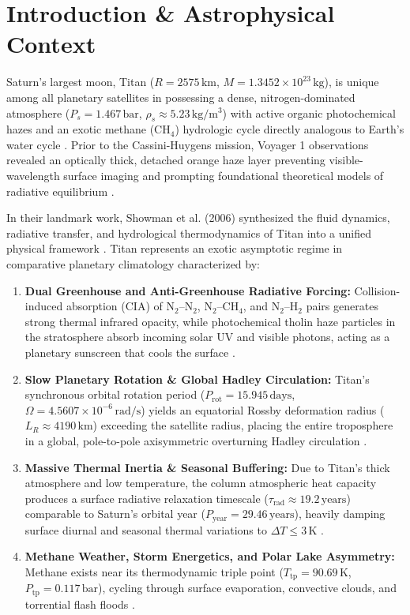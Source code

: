 \documentclass[11pt,a4paper]{article}
\begin{document}
\section{Introduction \& Astrophysical Context}
Saturn's largest moon, Titan ($R = 2575\,\mathrm{km}$, $M = 1.3452 \times 10^{23}\,\mathrm{kg}$), is unique among all planetary satellites in possessing a dense, nitrogen-dominated atmosphere ($P_s = 1.467\,\mathrm{bar}$, $\rho_s \approx 5.23\,\mathrm{kg/m^3}$) with active organic photochemical hazes and an exotic methane ($\mathrm{CH}_4$) hydrologic cycle directly analogous to Earth's water cycle \cite{flasar2005,fulchignoni2005,bird2005}. Prior to the Cassini-Huygens mission, Voyager 1 observations revealed an optically thick, detached orange haze layer preventing visible-wavelength surface imaging and prompting foundational theoretical models of radiative equilibrium \cite{mckay1991,lorenz2001}.

In their landmark work, Showman et al. (2006) synthesized the fluid dynamics, radiative transfer, and hydrological thermodynamics of Titan into a unified physical framework \cite{showman2006,mitchell2006,mitchell2008,tokano2001}. Titan represents an exotic asymptotic regime in comparative planetary climatology characterized by:
\begin{enumerate}
    \item \textbf{Dual Greenhouse and Anti-Greenhouse Radiative Forcing:} Collision-induced absorption (CIA) of $\mathrm{N}_2\text{--}\mathrm{N}_2$, $\mathrm{N}_2\text{--}\mathrm{CH}_4$, and $\mathrm{N}_2\text{--}\mathrm{H}_2$ pairs generates strong thermal infrared opacity, while photochemical tholin haze particles in the stratosphere absorb incoming solar UV and visible photons, acting as a planetary sunscreen that cools the surface \cite{mckay1991,showman2006}.
    \item \textbf{Slow Planetary Rotation \& Global Hadley Circulation:} Titan's synchronous orbital rotation period ($P_{\mathrm{rot}} = 15.945\,\mathrm{days}$, $\Omega = 4.5607 \times 10^{-6}\,\mathrm{rad/s}$) yields an equatorial Rossby deformation radius ($L_R \approx 4190\,\mathrm{km}$) exceeding the satellite radius, placing the entire troposphere in a global, pole-to-pole axisymmetric overturning Hadley circulation \cite{showman2006,mitchell2006}.
    \item \textbf{Massive Thermal Inertia \& Seasonal Buffering:} Due to Titan's thick atmosphere and low temperature, the column atmospheric heat capacity produces a surface radiative relaxation timescale ($\tau_{\mathrm{rad}} \approx 19.2\,\mathrm{years}$) comparable to Saturn's orbital year ($P_{\mathrm{year}} = 29.46\,\mathrm{years}$), heavily damping surface diurnal and seasonal thermal variations to $\Delta T \le 3\,\mathrm{K}$ \cite{flasar2005,showman2006}.
    \item \textbf{Methane Weather, Storm Energetics, and Polar Lake Asymmetry:} Methane exists near its thermodynamic triple point ($T_{\mathrm{tp}} = 90.69\,\mathrm{K}$, $P_{\mathrm{tp}} = 0.117\,\mathrm{bar}$), cycling through surface evaporation, convective clouds, and torrential flash floods \cite{lorenz2001,porco2005,aharonson2009}.
\end{enumerate}
\end{document}
